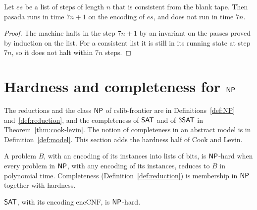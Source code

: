 \begin{theorem}
  \label{thm:machines-pass-time}
  \leanok
  Let $es$ be a list of steps of length $n$ that is consistent from the blank tape. Then $\mathrm{pasada}$ runs
  in time $7n + 1$ on the encoding of $es$, and does not run in time $7n$.
\end{theorem}

\begin{proof}
  \leanok
  The machine halts in the step $7n + 1$ by an invariant on the passes proved by induction on the list. For a
  consistent list it is still in its running state at step $7n$, so it does not halt within $7n$ steps.
\end{proof}

\section{Hardness and completeness for $\mathsf{NP}$}
\label{sec:machines-hardness}

The reductions and the class $\mathsf{NP}$ of cslib-frontier are in Definitions~\ref{def:NP} and~\ref{def:reduction},
and the completeness of $\mathsf{SAT}$ and of $3\mathsf{SAT}$ in Theorem~\ref{thm:cook-levin}. The notion of
completeness in an abstract model is in Definition~\ref{def:model}. This section adds the hardness half of
Cook and Levin.

\begin{definition}
  \label{def:machines-nphard}
  \leanok
  A problem $B$, with an encoding of its instances into lists of bits, is $\mathsf{NP}$-hard when every problem in
  $\mathsf{NP}$, with any encoding of its instances, reduces to $B$ in polynomial time. Completeness
  (Definition~\ref{def:reduction}) is membership in $\mathsf{NP}$ together with hardness.
\end{definition}

\begin{theorem}
  \label{thm:machines-sat-hard}
  \leanok
  $\mathsf{SAT}$, with its encoding $\mathrm{encCNF}$, is $\mathsf{NP}$-hard.
\end{theorem}

